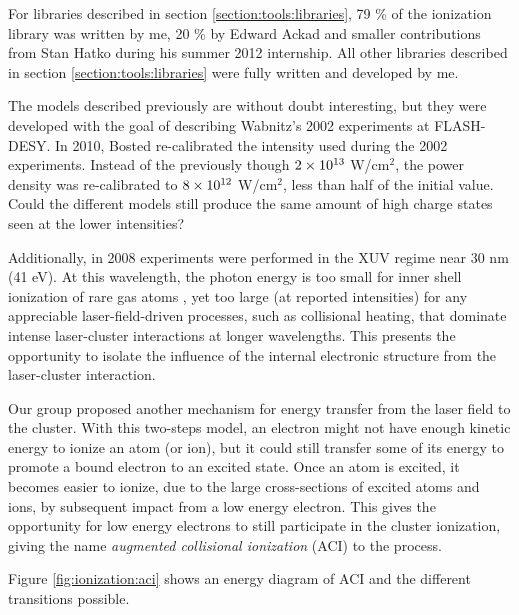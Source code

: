 For libraries described in section \ref{section:tools:libraries}, 79 \% of the
ionization library was written by me, 20 \% by Edward Ackad and smaller
contributions from Stan Hatko during his summer 2012 internship. All other
libraries described in section \ref{section:tools:libraries} were fully
written and developed by me.


The models described previously are without doubt interesting, but they were
developed with the goal of describing Wabnitz's 2002 experiments at FLASH-DESY.
In 2010, Bosted re-calibrated the intensity used during the 2002 experiments.
Instead of the previously though $\ten{2}{13}$ W/cm$^2$, the power density was
re-calibrated to $\ten{8}{12}$ W/cm$^2$, less than half of the initial value.
Could the different models still produce the same amount of high charge states
seen at the lower intensities?

Additionally, in 2008 experiments \cite{Bostedt2008,Murphy2008b} were performed
in the XUV regime near 30 nm (41 eV). At this wavelength, the photon energy is
too small for inner shell ionization of rare gas atoms , yet too large
(at reported intensities) for any appreciable laser-field-driven processes, such
as collisional heating, that dominate intense laser-cluster interactions at
longer wavelengths. This presents the opportunity to isolate the influence of
the internal electronic structure from the laser-cluster interaction.


Our group proposed another mechanism for energy transfer from the laser field
to the cluster. With this two-steps model, an electron might not have enough
kinetic energy to ionize an atom (or ion), but it could still transfer some of
its energy to promote a bound electron to an excited state. Once an atom is
excited, it becomes easier to ionize, due to the large cross-sections of excited
atoms and ions, by subsequent impact from a low energy electron. This gives the
opportunity for low energy electrons to still participate in the cluster
ionization, giving the name \textit{augmented collisional ionization} (ACI) to
the process.

Figure \ref{fig:ionization:aci} shows an energy diagram of ACI and the
different transitions possible.

